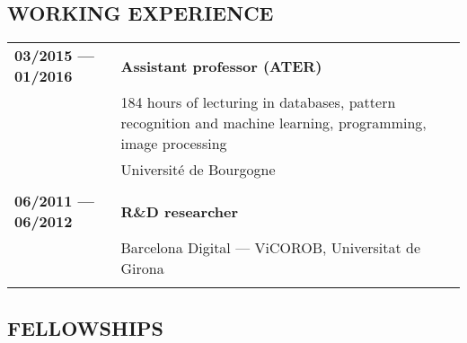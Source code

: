 {\subsection{WORKING EXPERIENCE}

\begin{table}[!h]
\begin{tabular}{p{4cm} p{13cm}}
 \\
\textbf{03/2015 --- 01/2016} & \textbf{Assistant professor (ATER)} \\
& 184 hours of lecturing in databases, pattern recognition and machine learning, programming, image processing \\
& Universit\'e de Bourgogne \\[.5em]  \\
\textbf{06/2011 --- 06/2012} & \textbf{R\&D researcher} \\
& Barcelona Digital --- ViCOROB, Universitat de Girona \\[.5em]  \\
\end{tabular}
\end{table}

\newpage

\subsection{FELLOWSHIPS}

}
